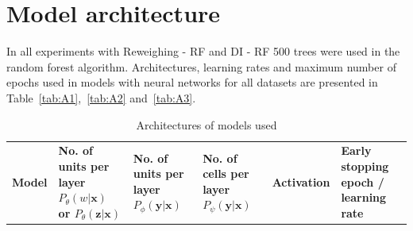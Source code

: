 \documentclass[preprint,12pt]{elsarticle}
\begin{document}
\section{Model architecture}
\label{app:Architecture}

In all experiments with Reweighing - RF and DI - RF 500 trees were used in the random forest algorithm. Architectures, learning rates and maximum number of epochs used in models with neural networks for all datasets are presented in Table~\ref{tab:A1},~\ref{tab:A2} and~\ref{tab:A3}.

\begin{table}
	\centering
	\caption{Architectures of models used}
	\label{Table:tab1}
	\begin{adjustbox}{max width=\textwidth, totalheight = \textheight-0.1in}
	\begin{tabular}{|L|L|L|L|L|L|}
			\toprule
			\textbf{Model} & {\textbf{No. of units per layer $P_\theta(w|\mathbf{x})$ or $P_\theta(\mathbf{z}|\mathbf{x})$}} & {\textbf{No. of units per layer $P_\phi(\mathbf{y}|\mathbf{x})$}} & {\textbf{No. of cells per layer $P_\psi(\mathbf{y}|\mathbf{x})$}} & \textbf{Activation} & {\textbf{Early stopping epoch / learning rate}} \\
			

\end{tabular}
\end{adjustbox}
\end{table}
\end{document}
